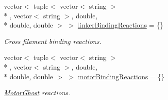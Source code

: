 {\bf }\par
\begin{DoxyCompactItemize}
\item 
vector$<$ tuple$<$ vector$<$ string $>$\\*
, vector$<$ string $>$, double, \\*
double, double $>$ $>$ \hyperlink{structChemistryData_ae3e27a2c950e196017c06f416ee94628}{linker\+Binding\+Reactions} = \{\}
\begin{DoxyCompactList}\small\item\em Cross filament binding reactions. \end{DoxyCompactList}\item 
vector$<$ tuple$<$ vector$<$ string $>$\\*
, vector$<$ string $>$, double, \\*
double, double $>$ $>$ \hyperlink{structChemistryData_a2a4b2e949b6e0b8f32158cf101d24fa6}{motor\+Binding\+Reactions} = \{\}
\begin{DoxyCompactList}\small\item\em \hyperlink{classMotorGhost}{Motor\+Ghost} reactions. \end{DoxyCompactList}\end{DoxyCompactItemize}

